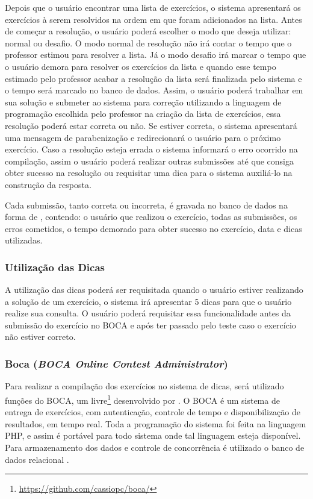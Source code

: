 Depois que o usuário encontrar uma lista de exercícios, o sistema apresentará os exercícios à serem resolvidos na ordem em que foram adicionados na lista. Antes de começar a resolução, o usuário poderá escolher o modo que deseja utilizar: normal ou desafio. O modo normal de resolução não irá contar o tempo que o professor estimou para resolver a lista. Já o modo desafio irá marcar o tempo que o usuário demora para resolver os exercícios da lista e quando esse tempo estimado pelo professor acabar a resolução da lista será finalizada pelo sistema e o tempo será marcado no banco de dados. Assim, o usuário poderá trabalhar em sua solução e submeter ao sistema para correção utilizando a linguagem de programação escolhida pelo professor na criação da lista de exercícios, essa resolução poderá estar correta ou não. Se estiver correta, o sistema apresentará uma mensagem de parabenização e redirecionará o usuário para o próximo exercício. Caso a resolução esteja errada o sistema informará o erro ocorrido na compilação, assim o usuário poderá realizar outras submissões até que consiga obter sucesso na resolução ou requisitar uma dica para o sistema auxiliá-lo na construção da resposta. 

Cada submissão, tanto correta ou incorreta, é gravada no banco de dados na forma de , contendo: o usuário que realizou o exercício, todas as submissões, os erros cometidos, o tempo demorado para obter sucesso no exercício, data e dicas utilizadas.

\subsubsection{Utilização das Dicas}

A utilização das dicas poderá ser requisitada quando o usuário estiver realizando a solução de um exercício, o sistema irá apresentar 5 dicas para que o usuário realize sua consulta. O usuário poderá requisitar essa funcionalidade antes da submissão do exercício no BOCA e após ter passado pelo teste caso o exercício não estiver correto.

\subsubsection{Boca (\textit{BOCA Online Contest Administrator})}

Para realizar a compilação dos exercícios no sistema de dicas, será utilizado funções do BOCA, um  livre\footnote{\url{https://github.com/cassiopc/boca/}} desenvolvido por . O BOCA é um sistema de entrega de exercícios, com autenticação, controle de tempo e disponibilização de resultados, em tempo real. Toda a programação do sistema foi feita na linguagem PHP, e assim é portável para todo sistema onde tal linguagem esteja disponível. Para armazenamento dos dados e controle de concorrência é utilizado o banco de dados relacional . 

